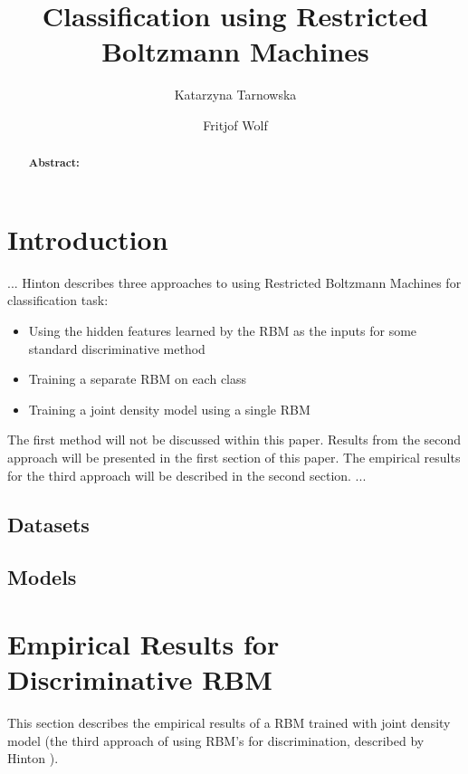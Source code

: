 \documentclass[a4paper]{scrartcl}
\begin{document}
\title{Classification using Restricted Boltzmann Machines}
\author{Katarzyna Tarnowska \and Fritjof Wolf}
\maketitle
\newpage
\begin{abstract}
\textbf{Abstract:} 
\end{abstract}

\section{Introduction}
...
Hinton \cite{Hinton} describes three approaches to using Restricted Boltzmann Machines for classification task:
\begin{itemize}
    \item Using the hidden features learned by the RBM as the inputs for some standard discriminative method
    \item Training a separate RBM on each class
	\item Training a joint density model using a single RBM
\end{itemize}
The first method will not be discussed within this paper. Results from the second approach will be presented in the first section of this paper. The empirical results for the third approach will be described in the second section.
...
\subsection{Datasets}
\subsection{Models}

\section{Empirical Results for Discriminative RBM}
This section describes the empirical results of a RBM trained with joint density model (the third approach of using RBM's for discrimination, described by Hinton \cite{Hinton}).
\end{document}
